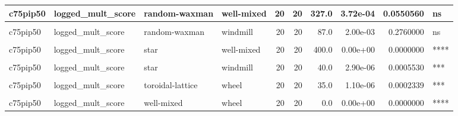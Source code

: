 \documentclass[
]{book}
\begin{document}
\begin{table}
\begin{tabular}{l|l|l|l|r|r|r|r|r|l}
c75pip50 & logged\_mult\_score & random-waxman & well-mixed & 20 & 20 & 327.0 & 3.72e-04 & 0.0550560 & ns\\
\hline
\cellcolor{gray!6}{c75pip50} & \cellcolor{gray!6}{logged\_mult\_score} & \cellcolor{gray!6}{random-waxman} & \cellcolor{gray!6}{wheel} & \cellcolor{gray!6}{20} & \cellcolor{gray!6}{20} & \cellcolor{gray!6}{9.0} & \cellcolor{gray!6}{0.00e+00} & \cellcolor{gray!6}{0.0000004} & \cellcolor{gray!6}{****}\\
\hline
c75pip50 & logged\_mult\_score & random-waxman & windmill & 20 & 20 & 87.0 & 2.00e-03 & 0.2760000 & ns\\
\hline
\cellcolor{gray!6}{c75pip50} & \cellcolor{gray!6}{logged\_mult\_score} & \cellcolor{gray!6}{star} & \cellcolor{gray!6}{toroidal-lattice} & \cellcolor{gray!6}{20} & \cellcolor{gray!6}{20} & \cellcolor{gray!6}{48.0} & \cellcolor{gray!6}{1.14e-05} & \cellcolor{gray!6}{0.0019608} & \cellcolor{gray!6}{**}\\
\hline
c75pip50 & logged\_mult\_score & star & well-mixed & 20 & 20 & 400.0 & 0.00e+00 & 0.0000000 & ****\\
\hline
\cellcolor{gray!6}{c75pip50} & \cellcolor{gray!6}{logged\_mult\_score} & \cellcolor{gray!6}{star} & \cellcolor{gray!6}{wheel} & \cellcolor{gray!6}{20} & \cellcolor{gray!6}{20} & \cellcolor{gray!6}{0.0} & \cellcolor{gray!6}{0.00e+00} & \cellcolor{gray!6}{0.0000000} & \cellcolor{gray!6}{****}\\
\hline
c75pip50 & logged\_mult\_score & star & windmill & 20 & 20 & 40.0 & 2.90e-06 & 0.0005530 & ***\\
\hline
\cellcolor{gray!6}{c75pip50} & \cellcolor{gray!6}{logged\_mult\_score} & \cellcolor{gray!6}{toroidal-lattice} & \cellcolor{gray!6}{well-mixed} & \cellcolor{gray!6}{20} & \cellcolor{gray!6}{20} & \cellcolor{gray!6}{360.0} & \cellcolor{gray!6}{2.90e-06} & \cellcolor{gray!6}{0.0005530} & \cellcolor{gray!6}{***}\\
\hline
c75pip50 & logged\_mult\_score & toroidal-lattice & wheel & 20 & 20 & 35.0 & 1.10e-06 & 0.0002339 & ***\\
\hline
\cellcolor{gray!6}{c75pip50} & \cellcolor{gray!6}{logged\_mult\_score} & \cellcolor{gray!6}{toroidal-lattice} & \cellcolor{gray!6}{windmill} & \cellcolor{gray!6}{20} & \cellcolor{gray!6}{20} & \cellcolor{gray!6}{184.0} & \cellcolor{gray!6}{6.78e-01} & \cellcolor{gray!6}{1.0000000} & \cellcolor{gray!6}{ns}\\
\hline
c75pip50 & logged\_mult\_score & well-mixed & wheel & 20 & 20 & 0.0 & 0.00e+00 & 0.0000000 & ****\\

\end{tabular}
\end{table}
\end{document}
